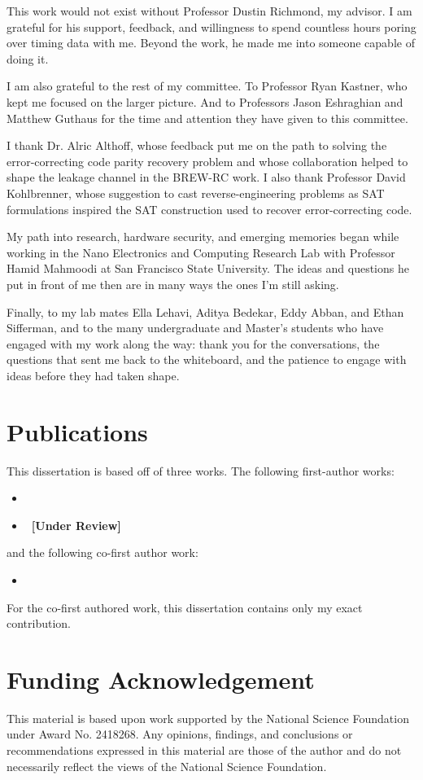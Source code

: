 This work would not exist without Professor Dustin Richmond, my advisor.
I am grateful for his support, feedback, and willingness to spend
countless hours poring over timing data with me. Beyond the work, he
made me into someone capable of doing it.

I am also grateful to the rest of my committee. To Professor Ryan
Kastner, who kept me focused on the larger picture. And to Professors
Jason Eshraghian and Matthew Guthaus for the time and attention they
have given to this committee.

I thank Dr. Alric Althoff, whose feedback put me on the path to solving
the error-correcting code parity recovery problem and whose
collaboration helped to shape the leakage channel in the BREW-RC work. I
also thank Professor David Kohlbrenner, whose suggestion to cast
reverse-engineering problems as SAT formulations inspired the SAT
construction used to recover error-correcting code.

My path into research, hardware security, and emerging memories began
while working in the Nano Electronics and Computing Research Lab with
Professor Hamid Mahmoodi at San Francisco State University. The ideas
and questions he put in front of me then are in many ways the ones I'm
still asking.

Finally, to my lab mates Ella Lehavi, Aditya Bedekar, Eddy Abban, and
Ethan Sifferman, and to the many undergraduate and Master's students who
have engaged with my work along the way: thank you for the
conversations, the questions that sent me back to the whiteboard, and
the patience to engage with ideas before they had taken shape.

\section{Publications}

This dissertation is based off of three works. The following
first-author works:
\begin{itemize}
	\item {}
	\item {}~\textbf{[Under Review]}
\end{itemize}
and the following co-first author work:
\begin{itemize}
	\item {}
\end{itemize}
For the co-first authored work, this dissertation contains only my exact
contribution.

\section{Funding Acknowledgement}

This material is based upon work supported by the National Science
Foundation under Award No. 2418268. Any opinions, findings, and
conclusions or recommendations expressed in this material are those of
the author and do not necessarily reflect the views of the National
Science Foundation.

